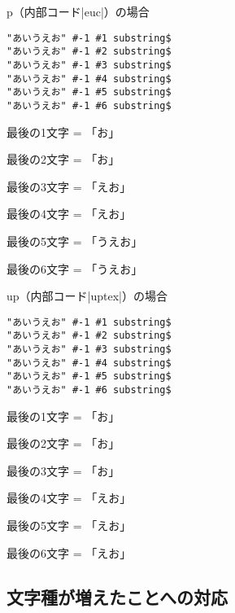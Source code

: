 \documentclass[a4paper,11pt,nomag,dvipdfmx]{jsarticle}
\def\pBibTeX{p\kern-.05em\BibTeX}
\def\upBibTeX{u\pBibTeX}
\def\pBibTeX{p\BibTeX}%
\def\upBibTeX{u\pBibTeX}%
\begin{document}
\pBibTeX （内部コード|euc|）の場合\par\medskip
\begin{minipage}{0.5\textwidth}
\begin{verbatim}
"あいうえお" #-1 #1 substring$
"あいうえお" #-1 #2 substring$
"あいうえお" #-1 #3 substring$
"あいうえお" #-1 #4 substring$
"あいうえお" #-1 #5 substring$
"あいうえお" #-1 #6 substring$
\end{verbatim}
\end{minipage}
\begin{minipage}{0.4\textwidth}
最後の1文字 = 「お」\par
最後の2文字 = 「お」\par
最後の3文字 = 「えお」\par
最後の4文字 = 「えお」\par
最後の5文字 = 「うえお」\par
最後の6文字 = 「うえお」
\end{minipage}\par\medskip

\upBibTeX （内部コード|uptex|）の場合\par\medskip
\begin{minipage}{0.5\textwidth}
\begin{verbatim}
"あいうえお" #-1 #1 substring$
"あいうえお" #-1 #2 substring$
"あいうえお" #-1 #3 substring$
"あいうえお" #-1 #4 substring$
"あいうえお" #-1 #5 substring$
"あいうえお" #-1 #6 substring$
\end{verbatim}
\end{minipage}
\begin{minipage}{0.4\textwidth}
最後の1文字 = 「お」\par
最後の2文字 = 「お」\par
最後の3文字 = 「お」\par
最後の4文字 = 「えお」\par
最後の5文字 = 「えお」\par
最後の6文字 = 「えお」
\end{minipage}\par\medskip

\subsection{文字種が増えたことへの対応}
\end{document}
